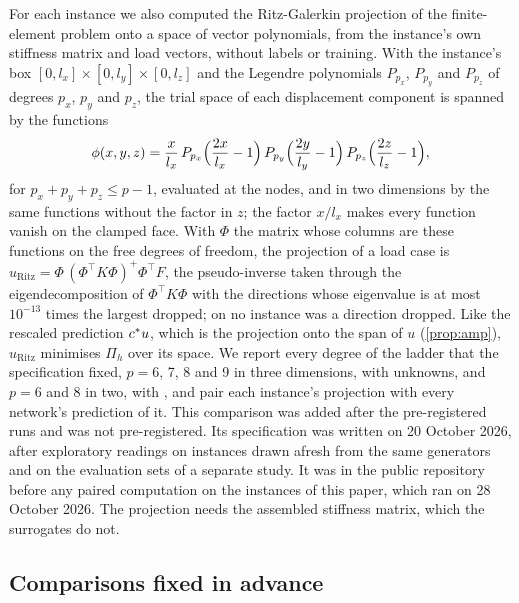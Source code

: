 For each instance we also computed the Ritz-Galerkin projection of the finite-element
problem onto a space of vector polynomials, from the instance's own stiffness matrix and
load vectors, without labels or training. With the instance's box
$[0,l_x]\times[0,l_y]\times[0,l_z]$ and the Legendre polynomials $P_{p_x}$, $P_{p_y}$ and
$P_{p_z}$ of degrees $p_x$, $p_y$ and $p_z$, the trial space of each displacement component
is spanned by the functions
\begin{equation}
\phi(x,y,z)=\frac{x}{l_x}\,P_{p_x}\Bigl(\frac{2x}{l_x}-1\Bigr)\,P_{p_y}\Bigl(\frac{2y}{l_y}-1\Bigr)\,
P_{p_z}\Bigl(\frac{2z}{l_z}-1\Bigr),
\label{eq:ritzbasis}
\end{equation}
for $p_x+p_y+p_z\le p-1$, evaluated at the nodes, and in two dimensions by the same
functions without the factor in $z$; the factor $x/l_x$ makes every function vanish on the
clamped face. With $\Phi$ the matrix whose columns are these functions on the free degrees
of freedom, the projection of a
load case is $u_{\mathrm{Ritz}}=\Phi\,(\Phi^{\top}K\Phi)^{+}\Phi^{\top}F$, the pseudo-inverse taken
through the eigendecomposition of $\Phi^{\top}K\Phi$ with the directions whose eigenvalue is
at most $10^{-13}$ times the largest dropped; on no instance was a direction dropped. Like
the rescaled prediction $c^{\ast} u$, which is the projection onto the span of $u$
(\cref{prop:amp}), $u_{\mathrm{Ritz}}$ minimises $\Pi_h$ over its space. We report every degree of the
ladder that the specification fixed, $p=6$, 7, 8 and 9 in three dimensions, with
\numRitzThreeK{} unknowns, and $p=6$ and 8 in two, with \numRitzTwoK{}, and pair each
instance's projection with every network's prediction of it. This comparison was added after
the pre-registered runs and was not pre-registered. Its specification was written on 20
October 2026, after exploratory readings on instances drawn afresh from the same generators
and on the evaluation sets of a separate study. It was in the public repository before any
paired computation on the instances of this paper, which ran on 28 October 2026. The
projection needs the assembled stiffness matrix, which the surrogates do not.

\subsection{Comparisons fixed in advance}\label{sec:methods:prereg}

